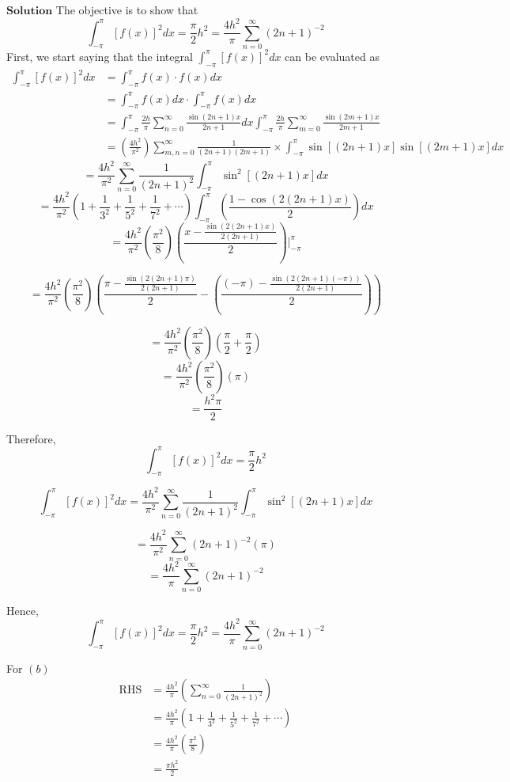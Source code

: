 $\boxed{\textbf{Solution}}$ The objective is to show that 
$$
\int_{-\pi}^{\pi}[f(x)]^{2} d x=\frac{\pi}{2} h^{2}=\frac{4 h^{2}}{\pi} \sum_{n=0}^{\infty}(2 n+1)^{-2}
$$
First, we start saying that the integral $\int_{-\pi}^{\pi}[f(x)]^{2} d x$ can be evaluated as
$$
\begin{aligned}
\int_{-\pi}^{\pi}[f(x)]^{2} d x &=\int_{-\pi}^{\pi} f(x) \cdot f(x) d x \\
&=\int_{-\pi}^{\pi} f(x) d x \cdot \int_{-\pi}^{\pi} f(x) d x \\
&=\int_{-\pi}^{\pi} \frac{2 h}{\pi} \sum_{n=0}^{\infty} \frac{\sin (2 n+1) x}{2 n+1} d x \int_{-\pi}^{\pi} \frac{2 h}{\pi} \sum_{m=0}^{\infty} \frac{\sin (2 m+1) x}{2 m+1} \\
&=\left(\frac{4 h^{2}}{\pi^{2}}\right) \sum_{m, n=0}^{\infty} \frac{1}{(2 n+1)(2 m+1)} \times \int_{-\pi}^{\pi} \sin [(2 n+1) x] \sin [(2 m+1) x] d x
\end{aligned}
$$
$$=\frac{4 h^{2}}{\pi^{2}} \sum_{n=0}^{\infty} \frac{1}{(2 n+1)^{2}} \int_{-\pi}^{\pi} \sin ^{2}[(2 n+1) x] d x$$
$$=\frac{4 h^{2}}{\pi^{2}}\left(1+\frac{1}{3^{2}}+\frac{1}{5^{2}}+\frac{1}{7^{2}}+\cdots\right) \int_{-\pi}^{\pi}\left(\frac{1-\cos (2(2 n+1) x)}{2}\right) d x$$
$$
=\frac{4 h^{2}}{\pi^{2}}\left(\frac{\pi^{2}}{8}\right)\left(\frac{x-\frac{\sin (2(2 n+1) x)}{2(2 n+1)}}{2}\right)\Bigg|_{-\pi}^{\pi}
$$

$$
=\frac{4 h^{2}}{\pi^{2}}\left(\frac{\pi^{2}}{8}\right)\left(\frac{\pi-\frac{\sin (2(2 n+1) \pi)}{2(2 n+1)}}{2}-\left(\frac{(-\pi)-\frac{\sin (2(2 n+1)(-\pi))}{2(2 n+1)}}{2}\right)\right)
$$

$$=\frac{4 h^{2}}{\pi^{2}}\left(\frac{\pi^{2}}{8}\right)\left(\frac{\pi}{2}+\frac{\pi}{2}\right)$$
$$=\frac{4 h^{2}}{\pi^{2}}\left(\frac{\pi^{2}}{8}\right)(\pi)$$
$$=\frac{h^{2} \pi}{2}$$


Therefore, $$\int_{-\pi}^{\pi}[f(x)]^{2} d x=\frac{\pi}{2} h^{2}$$

$$
\int_{-\pi}^{\pi}[f(x)]^{2} d x=\frac{4 h^{2}}{\pi^{2}} \sum_{n=0}^{\infty} \frac{1}{(2 n+1)^{2}} \int_{-\pi}^{\pi} \sin ^{2}[(2 n+1) x] d x
$$

$$=\frac{4 h^{2}}{\pi^{2}} \sum_{n=0}^{\infty}(2 n+1)^{-2}(\pi)$$
$$=\frac{4 h^{2}}{\pi} \sum_{n=0}^{\infty}(2 n+1)^{-2}$$

Hence, $$\int_{-\pi}^{\pi}[f(x)]^{2} d x=\frac{\pi}{2} h^{2}=\frac{4 h^{2}}{\pi} \sum_{n=0}^{\infty}(2 n+1)^{-2}$$


For $(b)$ $$
\begin{aligned}
\mathrm{RHS} &=\frac{4 h^{2}}{\pi}\left(\sum_{n=0}^{\infty} \frac{1}{(2 n+1)^{2}}\right) \\
&=\frac{4 h^{2}}{\pi}\left(1+\frac{1}{3^{2}}+\frac{1}{5^{2}}+\frac{1}{7^{2}}+\cdots\right) \\
&=\frac{4 h^{2}}{\pi}\left(\frac{\pi^{2}}{8}\right) \\
&=\frac{\pi h^{2}}{2}
\end{aligned}
$$


